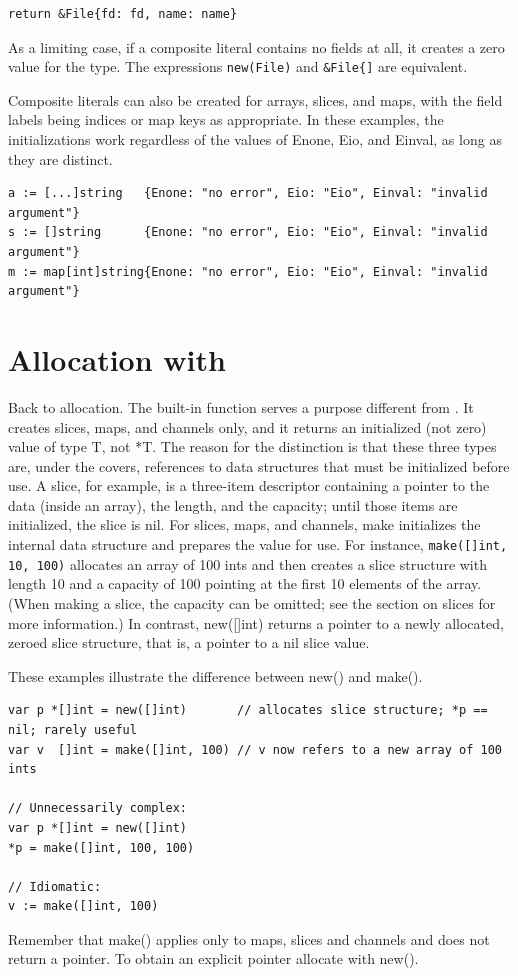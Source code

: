 \begin{lstlisting}
return &File{fd: fd, name: name}
\end{lstlisting}
As a limiting case, if a composite literal contains no fields at all, it
creates a zero value for the type. The expressions
\lstinline{new(File)} and 
\lstinline|&File{]| are equivalent.

Composite literals can also be created for arrays, slices, and maps,
with the field labels being indices or map keys as appropriate. In these
examples, the initializations work regardless of the values of Enone,
Eio, and Einval, as long as they are distinct.
\begin{lstlisting}
a := [...]string   {Enone: "no error", Eio: "Eio", Einval: "invalid argument"}
s := []string      {Enone: "no error", Eio: "Eio", Einval: "invalid argument"}
m := map[int]string{Enone: "no error", Eio: "Eio", Einval: "invalid argument"}
\end{lstlisting}

\section{Allocation with }
Back to allocation. The built-in function  serves a purpose
different from . It creates slices, maps, and channels only, and
it returns an initialized (not zero) value of type T, not *T. The reason
for the distinction is that these three types are, under the covers,
references to data structures that must be initialized before use. A
slice, for example, is a three-item descriptor containing a pointer to
the data (inside an array), the length, and the capacity; until those
items are initialized, the slice is nil. For slices, maps, and channels,
make initializes the internal data structure and prepares the value for
use. For instance,
\lstinline{make([]int, 10, 100)}
allocates an array of 100 ints and then creates a slice structure with
length 10 and a capacity of 100 pointing at the first 10 elements of the
array. (When making a slice, the capacity can be omitted; see the
section on slices for more information.) In contrast, new([]int) returns
a pointer to a newly allocated, zeroed slice structure, that is, a
pointer to a nil slice value.

These examples illustrate the difference between new() and make().
\begin{lstlisting}
var p *[]int = new([]int)       // allocates slice structure; *p == nil; rarely useful
var v  []int = make([]int, 100) // v now refers to a new array of 100 ints

// Unnecessarily complex:
var p *[]int = new([]int)
*p = make([]int, 100, 100)

// Idiomatic:
v := make([]int, 100)
\end{lstlisting}
Remember that make() applies only to maps, slices and channels and does
not return a pointer. To obtain an explicit pointer allocate with new().


